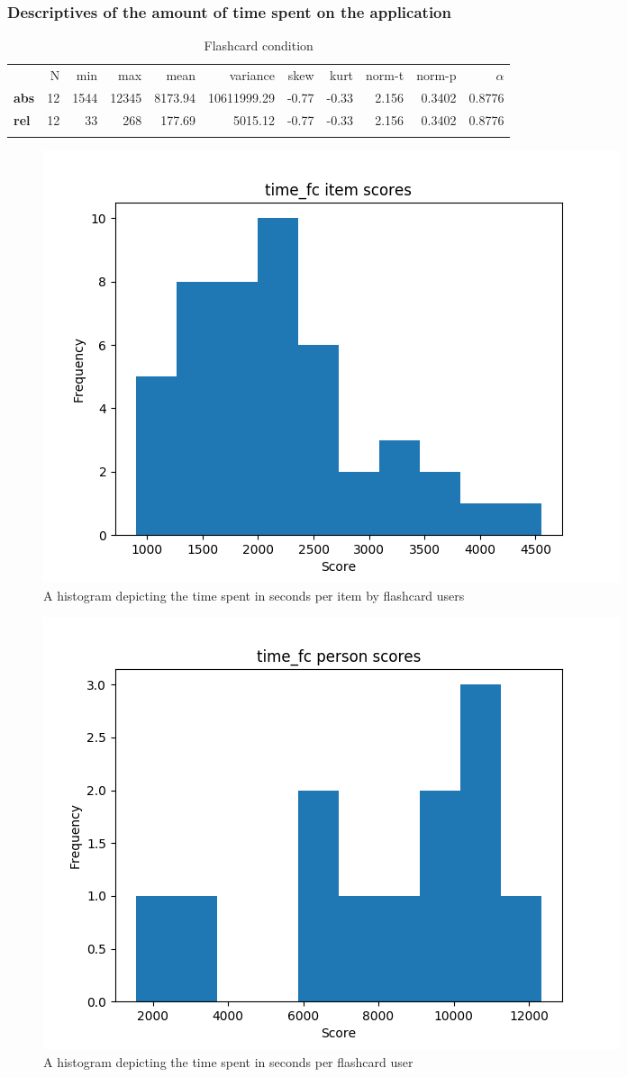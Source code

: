 \FloatBarrier
\subsubsection{Descriptives of the amount of time spent on the application}

\begin{longtable}[c]{@{}lrrrrrrrrrr@{}}
\caption{Flashcard condition}
\endfirsthead
\toprule\addlinespace
& N & min & max & mean & variance & skew & kurt & norm-t &
norm-p & $\alpha$
\\\addlinespace
\midrule
\textbf{abs} & 12 & 1544 & 12345 & 8173.94 & 10611999.29 & -0.77 & -0.33
& 2.156 & 0.3402 & 0.8776
\\\addlinespace
\textbf{rel} & 12 & 33 & 268 & 177.69 & 5015.12 & -0.77 & -0.33 & 2.156
& 0.3402 & 0.8776
\\\addlinespace
\bottomrule
    \label{tab:time_fc}
\end{longtable}

\begin{figure}
    \centering
    \includegraphics[width=.7\textwidth]{img/time_fc_diff.png}
    \caption{A histogram depicting the time spent in seconds per item by flashcard users} 
    \label{fig:time_fc_diff}
\end{figure}
\begin{figure}
    \centering
    \includegraphics[width=.7\textwidth]{img/time_fc_abil.png}
    \caption{A histogram depicting the time spent in seconds per flashcard user}
    \label{fig:time_fc_abil}
\end{figure}

